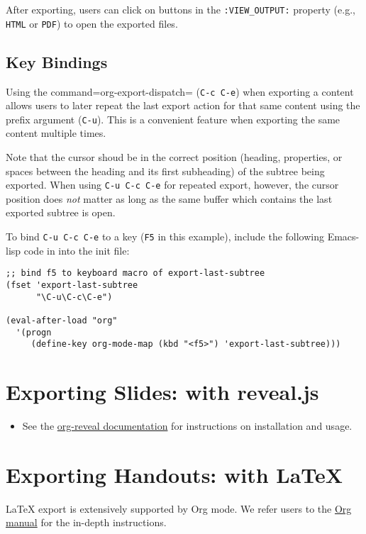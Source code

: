\documentclass[10pt,article]{article}
\begin{document}
After exporting, users can click on buttons in the \texttt{:VIEW\_OUTPUT:}
property (e.g., \texttt{HTML} or \texttt{PDF}) to open the exported files.

\subsection{Key Bindings}
\label{sec:orgc1146c6}
Using the command=org-export-dispatch= (\texttt{C-c C-e}) when exporting a
content allows users to later repeat the last export action for that
same content using the prefix argument (\texttt{C-u}). This is a convenient
feature when exporting the same content multiple times.

\vspace{5 mm}

\begin{mdframed}
Note that the cursor shoud be in the correct position (heading,
properties, or spaces between the heading and its first subheading) of
the subtree being exported. When using \texttt{C-u C-c C-e} for repeated
export, however, the cursor position does \emph{not} matter as long as the
same buffer which contains the last exported subtree is open.
\end{mdframed}

\vspace{5 mm}

To bind \texttt{C-u C-c C-e} to a key (\texttt{F5} in this example), include
the following Emacs-lisp code in into the init file:

\begin{verbatim}
;; bind f5 to keyboard macro of export-last-subtree
(fset 'export-last-subtree
      "\C-u\C-c\C-e")

(eval-after-load "org"
  '(progn
     (define-key org-mode-map (kbd "<f5>") 'export-last-subtree)))
\end{verbatim}
\section{Exporting Slides: with reveal.js}
\label{sec:org537276c}
\begin{itemize}
\item See the \href{https://github.com/yjwen/org-reveal/}{org-reveal documentation} for instructions on installation and usage.
\end{itemize}
\section{Exporting Handouts: with \LaTeX{}}
\label{sec:org8406f13}
\LaTeX{} export is extensively supported by Org mode. We refer users to the \href{https://orgmode.org/manual/LaTeX-export.html\#LaTeX-export}{Org
manual} for the in-depth instructions.
\end{document}
